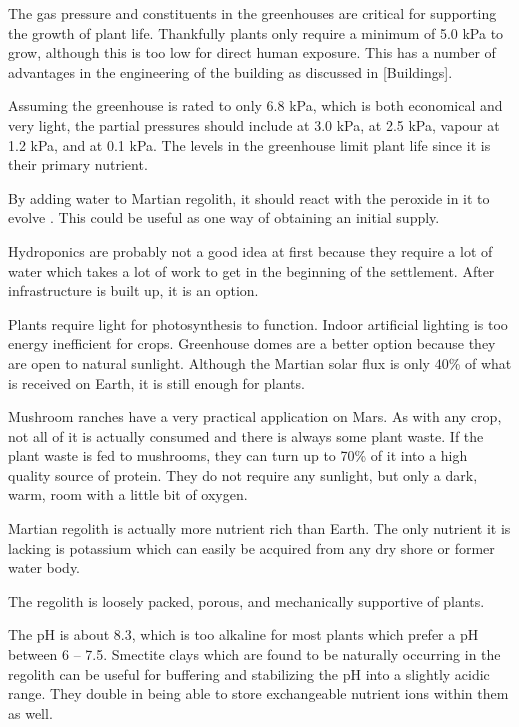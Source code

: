 The gas pressure and constituents in the greenhouses are critical for supporting the growth of plant life. Thankfully plants only require a minimum of 5.0 kPa to grow, although this is too low for direct human exposure. This has a number of advantages in the engineering of the building as discussed in [Buildings].

Assuming the greenhouse is rated to only 6.8 kPa, which is both economical and very light, the partial pressures should include  at 3.0 kPa,  at 2.5 kPa,  vapour at 1.2 kPa, and  at 0.1 kPa. The  levels in the greenhouse limit plant life since it is their primary nutrient. 

By adding water to Martian regolith, it should react with the peroxide in it to evolve . This could be useful as one way of obtaining an initial supply.

Hydroponics are probably not a good idea at first because they require a lot of water which takes a lot of work to get in the beginning of the settlement. After infrastructure is built up, it is an option.

Plants require light for photosynthesis to function. Indoor artificial lighting is too energy inefficient for crops. Greenhouse domes are a better option because they are open to natural sunlight. Although the Martian solar flux is only 40\% of what is received on Earth, it is still enough for plants.

Mushroom ranches have a very practical application on Mars. As with any crop, not all of it is actually consumed and there is always some plant waste. If the plant waste is fed to mushrooms, they can turn up to 70\% of it into a high quality source of protein. They do not require any sunlight, but only a dark, warm, room with a little bit of oxygen.


Martian regolith is actually more nutrient rich than Earth. The only nutrient it is lacking is potassium which can easily be acquired from any dry shore or former water body.

The regolith is loosely packed, porous, and mechanically supportive of plants. 

The pH is about 8.3, which is too alkaline for most plants which prefer a pH between 6 -- 7.5. Smectite clays which are found to be naturally occurring in the regolith can be useful for buffering and stabilizing the pH into a slightly acidic range. They double in being able to store exchangeable nutrient ions within them as well.

